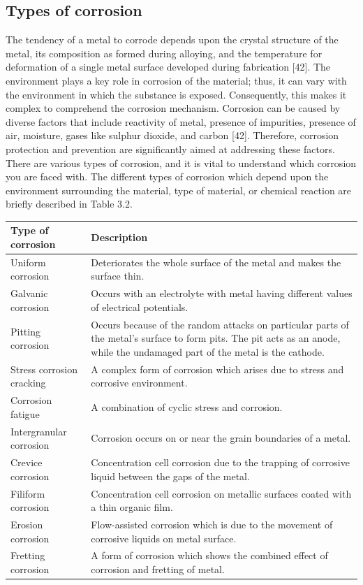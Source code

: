 \documentclass[12pt]{report}
\begin{document}
\subsection{Types of corrosion} 
The tendency of a metal to corrode depends upon the crystal structure of the metal, its composition as formed during alloying, and the temperature for deformation of a single metal surface developed during fabrication [42]. The environment plays a key role in corrosion of the material; thus, it can vary with the environment in which the substance is exposed. Consequently, this makes it complex to comprehend the corrosion mechanism. Corrosion can be caused by diverse factors that include reactivity of metal, presence of impurities, presence of air, moisture, gases like sulphur dioxide, and carbon [42]. Therefore, corrosion protection and prevention are significantly aimed at addressing these factors. There are various types of corrosion, and it is vital to understand which corrosion you are faced with. The different types of corrosion which depend upon the environment surrounding the material, type of material, or chemical reaction are briefly described in Table 3.2.


\begin{center}
\begin{tabular}{m{} m{}}
\hline
Type of corrosion & Description \\
\hline
Uniform corrosion & Deteriorates the whole surface of the metal and makes the surface thin. \\
Galvanic corrosion & Occurs with an electrolyte with metal having different values of electrical potentials. \\
Pitting corrosion & Occurs because of the random attacks on particular parts of the metal’s surface to form pits. The pit acts as an anode, while the undamaged part of the metal is the cathode. \\
Stress corrosion cracking & A complex form of corrosion which arises due to stress and  corrosive environment. \\
Corrosion fatigue & A combination of cyclic stress and corrosion.  \\
Intergranular corrosion & Corrosion occurs on or near the grain boundaries of a metal.  \\
Crevice corrosion & Concentration cell corrosion due to the trapping of corrosive liquid  between the gaps of the metal. \\
Filiform corrosion & Concentration cell corrosion on metallic surfaces coated with a thin  organic film. \\
Erosion corrosion & Flow-assisted corrosion which is due to the movement of corrosive  liquids on metal surface. \\
Fretting corrosion & A form of corrosion which shows the combined effect of corrosion and  fretting of metal. \\
\hline
\end{tabular}
\end{center}
\end{document}
